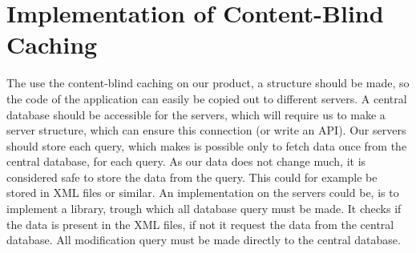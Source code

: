\section{Implementation of Content-Blind Caching}
The use the content-blind caching on our product, a structure should be made, so the code of the application can easily be copied out to different servers. A central database should be accessible for the servers, which will require us to make a server structure, which can ensure this connection (or write an API). 
Our servers should store each query, which makes is possible only to fetch data once from the central database, for each query. As our data does not change much, it is considered safe to store the data from the query. This could for example be stored in XML files or similar.
An implementation on the servers could be, is to implement a library, trough which all database query must be made. It checks if the data is present in the XML files, if not it request the data from the central database. 
All modification query must be made directly to the central database.